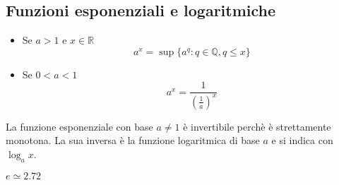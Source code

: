 \documentclass[12pt, a4paper]{report}
\begin{document}
    \subsection{Funzioni esponenziali e logaritmiche}
    \begin{itemize}
        \item Se $a>1$ e $x\in \mathbb{R}$ \begin{equation*}
            a^{x}=\sup\{a^{q}:q\in\mathbb{Q},q\leq x\}
        \end{equation*}
        \item Se $0<a<1$ \begin{equation*}
            a^{x}=\frac{1}{\left(\frac{1}{a}\right)^{x}}
        \end{equation*}
    \end{itemize}
    La funzione esponenziale con base $a\neq 1$ è invertibile perchè è strettamente monotona. La sua inversa è la funzione logaritmica di base $a$ e si indica con $\log_{a}x$.
    \begin{center}
    \end{center}
    $e \simeq 2.72$
\end{document}
